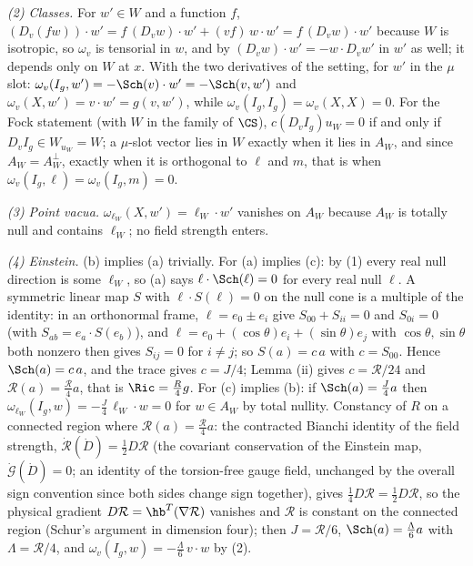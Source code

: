 \emph{(2) Classes.} For $w' \in W$ and a function $f$, $(D_{v}(fw))\cdot w' = f\,(D_{v}w)\cdot w' + (vf)\,w\cdot w' = f\,(D_{v}w)\cdot w'$ because $W$ is isotropic, so $\omega_{v}$ is tensorial in $w$, and by $(D_{v}w)\cdot w' = -w\cdot D_{v}w'$ in $w'$ as well; it depends only on $W$ at $x$. With the two derivatives of the setting, for $w'$ in the $\mu$ slot: $\omega_{v}(I_g, w') = -\Sch(v)\cdot w' = -\Sch(v, w')$ and $\omega_{v}(X, w') = v\cdot w' = g(v, w')$, while $\omega_{v}(I_g, I_g) = \omega_{v}(X, X) = 0$. For the Fock statement (with $W$ in the family of $\CS$), $c(D_{v}I_g)u_W = 0$ if and only if $D_{v}I_g \in W_{u_W} = W$; a $\mu$-slot vector lies in $W$ exactly when it lies in $A_W$, and since $A_W = A_W^{\perp}$, exactly when it is orthogonal to $\ell$ and $m$, that is when $\omega_{v}(I_g, \ell) = \omega_{v}(I_g, m) = 0$.

\emph{(3) Point vacua.} $\omega_{\ell_W}(X, w') = \ell_W\cdot w'$ vanishes on $A_W$ because $A_W$ is totally null and contains $\ell_W$; no field strength enters.

\emph{(4) Einstein.} (b) implies (a) trivially. For (a) implies (c): by (1) every real null direction is some $\ell_W$, so (a) says $\ell\cdot\Sch(\ell) = 0$ for every real null $\ell$. A symmetric linear map $S$ with $\ell\cdot S(\ell) = 0$ on the null cone is a multiple of the identity: in an orthonormal frame, $\ell = e_{0} \pm e_{i}$ give $S_{00} + S_{ii} = 0$ and $S_{0i} = 0$ (with $S_{ab} = e_{a}\cdot S(e_{b})$), and $\ell = e_{0} + (\cos\theta)e_{i} + (\sin\theta)e_{j}$ with $\cos\theta, \sin\theta$ both nonzero then gives $S_{ij} = 0$ for $i \neq j$; so $S(a) = c\,a$ with $c = S_{00}$. Hence $\Sch(a) = c\,a$, and the trace gives $c = J/4$; Lemma (ii) gives $c = \mathcal{R}/24$ and $\mathcal{R}(a) = \tfrac{\mathcal{R}}{4}a$, that is $\Ric = \tfrac{R}{4}g$. For (c) implies (b): if $\Sch(a) = \tfrac{J}{4}a$ then $\omega_{\ell_W}(I_g, w) = -\tfrac{J}{4}\,\ell_W\cdot w = 0$ for $w \in A_W$ by total nullity. Constancy of $R$ on a connected region where $\mathcal{R}(a) = \tfrac{\mathcal{R}}{4}a$: the contracted Bianchi identity of the field strength, $\dot{\mathcal{R}}(\dot D) = \tfrac12 D\mathcal{R}$ (the covariant conservation of the Einstein map, $\dot{\mathcal{G}}(\dot D) = 0$; an identity of the torsion-free gauge field, unchanged by the overall sign convention since both sides change sign together), gives $\tfrac14 D\mathcal{R} = \tfrac12 D\mathcal{R}$, so the physical gradient $D\mathcal{R} = \hb^{T}(\nabla\mathcal{R})$ vanishes and $\mathcal{R}$ is constant on the connected region (Schur's argument in dimension four); then $J = \mathcal{R}/6$, $\Sch(a) = \tfrac{\Lambda}{6}a$ with $\Lambda = \mathcal{R}/4$, and $\omega_{v}(I_g, w) = -\tfrac{\Lambda}{6}\,v\cdot w$ by (2).

